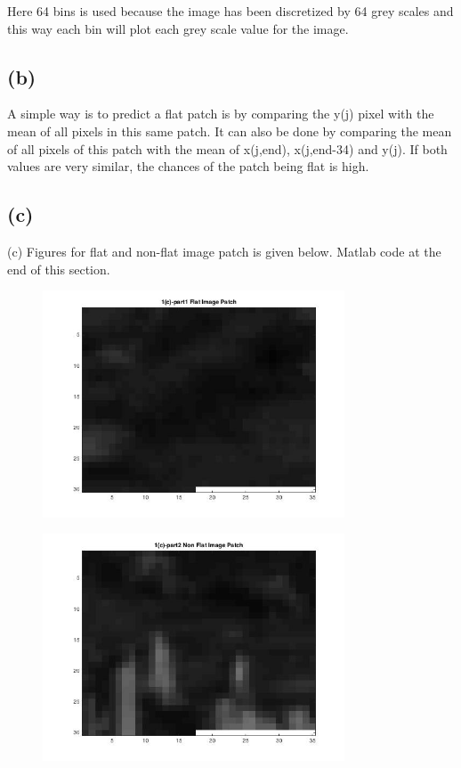 \documentclass[english]{article}
\begin{document}
Here 64 bins is used because the image has been discretized by 64 grey
scales and this way each bin will plot each grey scale value for the image.

\subsection*{(b)}
A simple way is to predict a flat patch is by comparing the y(j) pixel with the mean of 
all pixels in this same patch. It can also be done by comparing the mean of all pixels of this 
patch with the mean of x(j,end), x(j,end-34) and y(j). If both values are very similar, the chances of 
the patch being flat is high.

\subsection*{(c)}
(c) Figures for flat and non-flat image patch is given below.
Matlab code at the end of this section.

\begin{figure}[h!]
  \caption{}
  \centering
    \includegraphics[width=0.8\textwidth]{fig_1_1_c_1_flat.jpg}
\end{figure}
\begin{figure}[h!]
  \caption{}
  \centering
    \includegraphics[width=0.8\textwidth]{fig_1_1_c_2_nonflat.jpg}
\end{figure}
\end{document}
